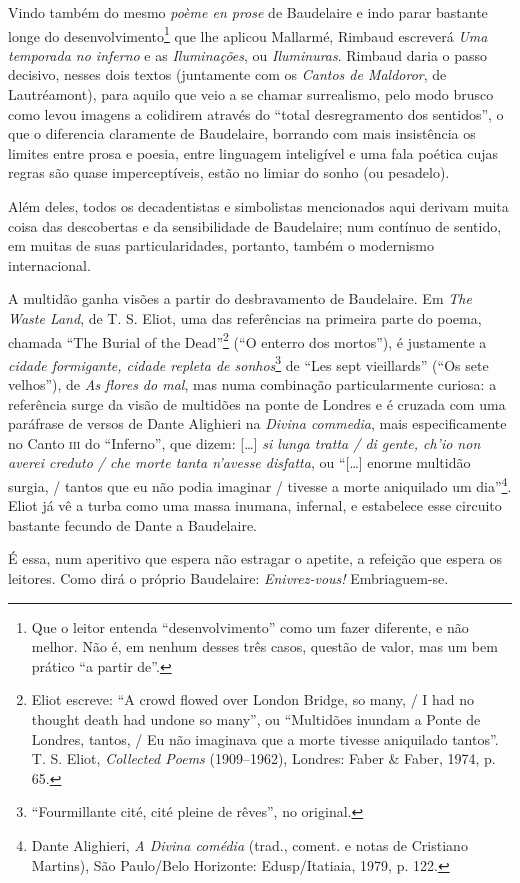 Vindo também do mesmo \textit{poème en prose} de Baudelaire e indo parar
bastante longe do desenvolvimento\footnote{ Que o leitor entenda
“desenvolvimento” como um fazer diferente, e não melhor. Não é, em
nenhum desses três casos, questão de valor, mas um bem prático “a
partir de”.} que lhe aplicou Mallarmé, Rimbaud escreverá
\textit{Uma temporada no inferno} e as
\textit{Iluminações}, ou \textit{Iluminuras}. Rimbaud daria o passo decisivo, nesses
dois textos (juntamente com os \textit{Cantos de Maldoror}, de
Lautréamont), para aquilo que veio a se chamar surrealismo, pelo modo
brusco como levou imagens a colidirem através do “total desregramento
dos sentidos”, o que o diferencia claramente de Baudelaire, borrando
com mais insistência os limites entre prosa e poesia, entre linguagem
inteligível e uma fala poética cujas regras são quase imperceptíveis,
estão no limiar do sonho (ou pesadelo).

Além deles, todos os decadentistas e simbolistas mencionados aqui
derivam muita coisa das descobertas e da sensibilidade de Baudelaire;
num contínuo de sentido, em muitas de suas particularidades, portanto,
também o modernismo internacional.

A multidão ganha visões a partir do desbravamento de Baudelaire. Em \textit{The
Waste Land}, de T. S. Eliot, uma das referências na primeira parte do
poema, chamada “The Burial of the Dead”\footnote{ Eliot escreve: “A
crowd flowed over London Bridge, so many, / I had no thought death had
undone so many”, ou “Multidões inundam a Ponte de
Londres, tantos, / Eu não imaginava que a morte tivesse aniquilado
tantos”. T. S. Eliot, \textit{Collected Poems} (1909--1962), Londres: Faber \&
Faber, 1974, p. 65.} (“O enterro dos mortos”), é justamente a
\textit{cidade formigante, cidade repleta de sonhos}\footnote{
“Fourmillante cité, cité pleine de rêves”, no original.} de “Les sept
vieillards” (“Os sete velhos”), de \textit{As flores do mal}, mas numa
combinação particularmente curiosa: a referência surge da visão de
multidões na ponte de Londres e é cruzada com uma paráfrase de versos
de Dante Alighieri na \textit{Divina commedia}, mais especificamente no
Canto \textsc{iii} do “Inferno”, que dizem: […] \textit{ si lunga tratta / di gente,
ch’io non averei creduto / che morte tanta n’avesse disfatta}, ou “[…]
enorme multidão surgia, / tantos que eu não podia imaginar / tivesse a
morte aniquilado um dia”\footnote{ Dante Alighieri,  \textit{A Divina comédia}
(trad., coment. e notas de Cristiano Martins), São Paulo/Belo
Horizonte: Edusp/Itatiaia, 1979, p. 122.}.  Eliot já vê a turba como
uma massa inumana, infernal, e estabelece esse circuito bastante
fecundo de Dante a Baudelaire.

É essa, num aperitivo que espera não estragar o apetite, a refeição que espera os leitores. Como dirá o próprio Baudelaire: \textit{Enivrez-vous!} Embriaguem-se.



